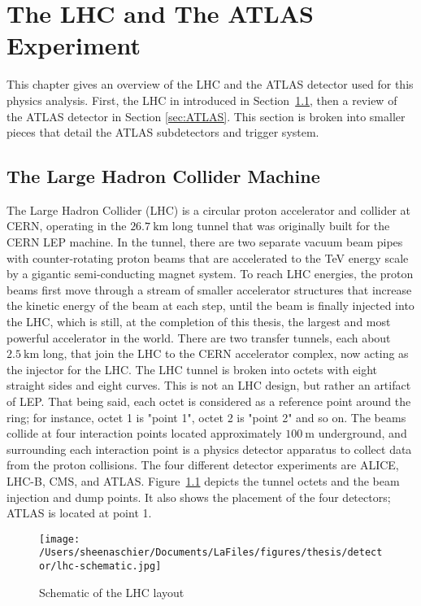 \chapter{The LHC and The ATLAS Experiment}
\label{ch:detector}
This chapter gives an overview of the LHC and the ATLAS detector used for this physics analysis.  First, the LHC in introduced in Section~\ref{sec:LHC}, then a review of the ATLAS detector in Section \ref{sec:ATLAS}.  This section is broken into smaller pieces that detail the ATLAS subdetectors and trigger system. %
\section{The Large Hadron Collider Machine}
\label{sec:LHC}

The Large Hadron Collider (LHC) is a circular proton accelerator and collider at CERN, operating in the $26.7~\mathrm{km}$ long tunnel that was originally built for the CERN LEP machine.  In the tunnel, there are two separate vacuum beam pipes with counter-rotating proton beams that are accelerated to the TeV energy scale by a gigantic semi-conducting magnet system.  To reach LHC energies, the proton beams first move through a stream of smaller accelerator structures that increase the kinetic energy of the beam at each step, until the beam is finally injected into the LHC, which is still, at the completion of this thesis, the largest and most powerful accelerator in the world.  There are two transfer tunnels, each about $2.5~\mathrm{km}$ long, that join the LHC to the CERN accelerator complex, now acting as the injector for the LHC.  The LHC tunnel is broken into octets with eight straight sides and eight curves.  This is not an LHC design, but rather an artifact of LEP.   That being said, each octet is considered as a reference point around the ring; for instance, octet 1 is "point 1", octet 2 is "point 2" and so on.  The beams collide at four interaction points located approximately $100~\mathrm{m}$ underground, and surrounding each interaction point is a physics detector apparatus to collect data from the proton collisions.  The four different detector experiments are ALICE, LHC-B, CMS, and ATLAS.  Figure~\ref{fig:lhc} depicts the tunnel octets and the beam injection and dump points.  It also shows the placement of the four detectors; ATLAS is located at point 1.
  \begin{figure}[tbp]
    \centering
 \texttt{[image: /Users/sheenaschier/Documents/LaFiles/figures/thesis/detector/lhc-schematic.jpg]}
    \caption{Schematic of the LHC layout}
   \label{fig:lhc}
 \end{figure}
 
